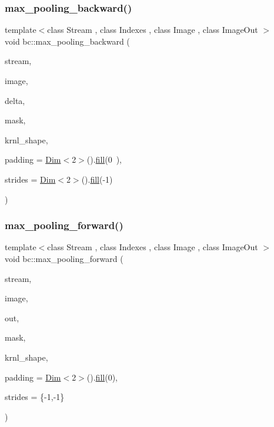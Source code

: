 \subsubsection{\texorpdfstring{max\+\_\+pooling\+\_\+backward()}{max\_pooling\_backward()}}
{\footnotesize\ttfamily template$<$class Stream , class Indexes , class Image , class Image\+Out $>$ \\
void bc\+::max\+\_\+pooling\+\_\+backward (\begin{DoxyParamCaption}\item[{\hyperlink{classbc_1_1streams_1_1Stream}{Stream}}]{stream,  }\item[{Image}]{image,  }\item[{Image\+Out}]{delta,  }\item[{Indexes}]{mask,  }\item[{\hyperlink{structbc_1_1Dim}{Dim}$<$ 2 $>$}]{krnl\+\_\+shape,  }\item[{\hyperlink{structbc_1_1Dim}{Dim}$<$ 2 $>$}]{padding = {\ttfamily \hyperlink{structbc_1_1Dim}{Dim}$<$2$>$().\hyperlink{tensor__iteralgos_8h_afd10a40f252abd24d1faa2752becdd53}{fill}(0~)},  }\item[{\hyperlink{structbc_1_1Dim}{Dim}$<$ 2 $>$}]{strides = {\ttfamily \hyperlink{structbc_1_1Dim}{Dim}$<$2$>$().\hyperlink{tensor__iteralgos_8h_afd10a40f252abd24d1faa2752becdd53}{fill}(-\/1)} }\end{DoxyParamCaption})}

\mbox{\label{namespacebc_a679477ae62ae0b0b8af47e929fd3e879}} 
\subsubsection{\texorpdfstring{max\+\_\+pooling\+\_\+forward()}{max\_pooling\_forward()}}
{\footnotesize\ttfamily template$<$class Stream , class Indexes , class Image , class Image\+Out $>$ \\
void bc\+::max\+\_\+pooling\+\_\+forward (\begin{DoxyParamCaption}\item[{\hyperlink{classbc_1_1streams_1_1Stream}{Stream}}]{stream,  }\item[{Image}]{image,  }\item[{Image\+Out}]{out,  }\item[{Indexes}]{mask,  }\item[{\hyperlink{structbc_1_1Dim}{Dim}$<$ 2 $>$}]{krnl\+\_\+shape,  }\item[{\hyperlink{structbc_1_1Dim}{Dim}$<$ 2 $>$}]{padding = {\ttfamily \hyperlink{structbc_1_1Dim}{Dim}$<$2$>$().\hyperlink{tensor__iteralgos_8h_afd10a40f252abd24d1faa2752becdd53}{fill}(0)},  }\item[{\hyperlink{structbc_1_1Dim}{Dim}$<$ 2 $>$}]{strides = {\ttfamily \{-\/1,-\/1\}} }\end{DoxyParamCaption})}

